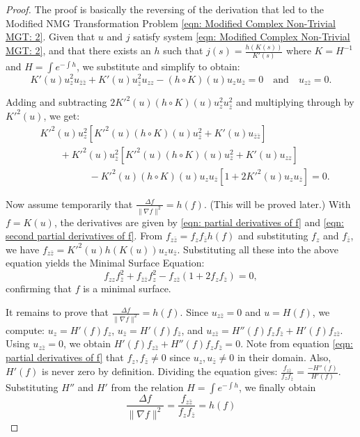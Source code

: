 \documentclass[12pt]{article}
\theoremstyle{plain}
\theoremstyle{definition}
\theoremstyle{remark}
\begin{document}
\begin{proof}
	The proof is basically the reversing of the derivation that led to the Modified NMG Transformation Problem \ref{eqn: Modified Complex Non-Trivial MGT: 2}. Given that \(u\) and \(j\) satisfy system \ref{eqn: Modified Complex Non-Trivial MGT: 2}, and that there exists an \(h\) such that \(j(s) = \frac{h(K(s))}{K'(s)}\) where \(K = H^{-1}\) and \(H = \int e^{-\int h}\), we substitute and simplify to obtain:
	\[
	K'(u) u_z^2 u_{\bar{z}\bar{z}} + K'(u) u_{\bar{z}}^2 u_{zz} - (h \circ K)(u) u_z u_{\bar{z}} = 0 \quad \text{and} \quad u_{z\bar{z}} = 0.
	\]
	
	Adding and subtracting \(2 {K'}^2(u) (h \circ K)(u) u_z^2 u_{\bar{z}}^2\) and multiplying through by \({K'}^2(u)\), we get:
	\begin{align*}
		&{K'}^2(u) u_z^2 \left[{K'}^2(u) (h \circ K)(u) u_{\bar{z}}^2 + K'(u) u_{\bar{z}\bar{z}}\right] \\
		&\quad\quad + {K'}^2(u) u_{\bar{z}}^2 \left[{K'}^2(u) (h \circ K)(u) u_z^2 + K'(u) u_{zz}\right] \\
		&\quad\quad\quad\quad\quad- {K'}^2(u) (h \circ K)(u) u_z u_{\bar{z}} \left[1 + 2 {K'}^2(u) u_z u_{\bar{z}}\right] = 0.
	\end{align*}
	
	Now assume temporarily that \(\frac{\Delta f}{\|\nabla f\|^2} = h(f)\). (This will be proved later.) With \(f = K(u)\), the derivatives are given by \ref{eqn: partial derivatives of f} and \ref{eqn: second partial derivatives of f}. From \(f_{z\bar{z}} = f_z f_{\bar{z}} h(f)\) and substituting \(f_z\) and \(f_{\bar{z}}\), we have \(f_{z\bar{z}} = {K'}^2(u) h(K(u)) u_z u_{\bar{z}}\). Substituting all these into the above equation yields the Minimal Surface Equation:
	\[
	f_{zz} f_{\bar{z}}^2 + f_{\bar{z}\bar{z}} f_z^2 - f_{z\bar{z}}(1 + 2 f_z f_{\bar{z}}) = 0,
	\]
	confirming that \(f\) is a minimal surface.
	
	It remains to prove that \(\frac{\Delta f}{\|\nabla f\|^2} = h(f)\). Since \(u_{z\bar{z}} = 0\) and \(u = H(f)\), we compute: \(u_z = H'(f) f_z\), \(u_{\bar{z}} = H'(f) f_{\bar{z}}\), and \(u_{z\bar{z}} = H''(f) f_z f_{\bar{z}} + H'(f) f_{z\bar{z}}\). Using \(u_{z\bar{z}} = 0\), we obtain \(H'(f) f_{z\bar{z}} + H''(f) f_z f_{\bar{z}} = 0\). Note from equation \ref{eqn: partial derivatives of f} that \(f_z, f_{\bar{z}} \neq 0\) since \(u_z, u_{\bar{z}} \neq 0\) in their domain. Also, \(H'(f)\) is never zero by definition. Dividing the equation gives: \( \frac{f_{z\bar{z}}}{f_z f_{\bar{z}}} = \frac{-H''(f)}{H'(f)}\).	Substituting \(H''\) and \(H'\) from the relation \(H = \int e^{-\int h}\), we finally obtain 
	\[
	  \frac{\Delta f}{\|\nabla f\|^2} = \frac{f_{z\bar{z}}}{f_z f_{\bar{z}}} = h(f)
	\]
\end{proof}
 
\end{document}
